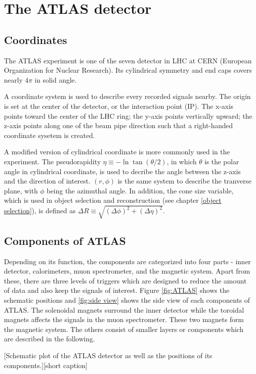 \documentclass[class=NCU_thesis, crop=false]{standalone}
\begin{document}
\chapter{The ATLAS detector}\label{ATLAS}
\section{Coordinates}
	The ATLAS experiment \cite{1748-0221-3-08-S08003} is one of the seven detector in LHC at CERN (European Organization for Nuclear Research). Its cylindrical symmetry and end caps covers nearly $4\pi$ in solid angle.
	
	A coordinate system is used to describe every recorded signals nearby. The origin is set at the center of the detector, or the interaction point (IP). The x-axis points toward the center of the LHC ring; the y-axis points vertically upward; the z-axis points along one of the beam pipe direction such that a right-handed coordinate sysetem is created.
	
	A modified version of cylindrical coordinate is more commonly used in the experiment. The pseudorapidity $\eta \equiv -\ln\tan(\theta / 2)$, in which $\theta$ is the polar angle in cylindrical coordinate, is used to decribe the angle between the z-axis and the direction of interest. $(r, \phi)$ is the same system to describe the tranverse plane, with $\phi$ being the azimuthal angle. In addition, the cone size variable, which is used in object selection and reconstruction (see chapter \ref{object selection}), is defined as $\Delta R \equiv \sqrt{(\Delta \phi)^2 + (\Delta \eta)^2}$.

\section{Components of ATLAS}
	Depending on its function, the components are categorized into four parts - inner detector, calorimeters, muon spectrometer, and the magnetic system. Apart from these, there are three levels of triggers which are designed to reduce the amount of data and also keep the signals of interest. Figure \ref{fig:ATLAS} shows the schematic positions and \ref{fig:side view} shows the side view of each components of ATLAS. The solenoidal magnets surround the inner detector while the toroidal magnets affects the signals in the muon spectrometer. These two magnets form the magnetic system. The others consist of smaller layers or components which are described in the following.
	
	[Schematic plot of the ATLAS detector as well as the positions of its components.][short caption]
	
\end{document}
